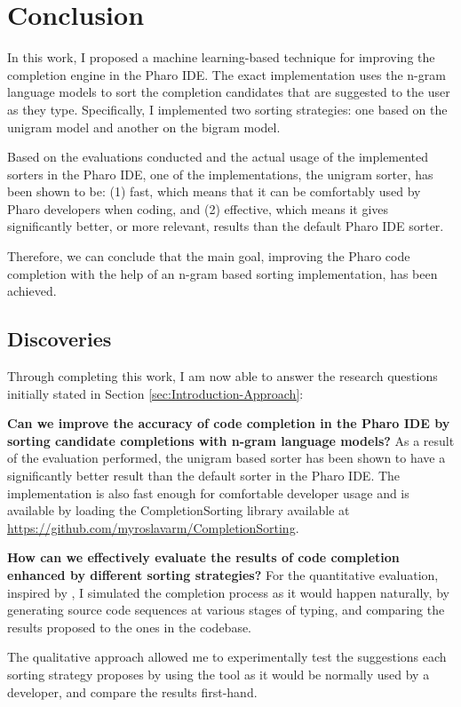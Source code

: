 \documentclass[sigplan,screen]{acmart}
\begin{document}
\section{Conclusion}
In this work, I proposed a machine learning-based technique for improving the completion engine in the Pharo IDE. The exact implementation uses the n-gram language models to sort the completion candidates that are suggested to the user as they type. Specifically, I implemented two sorting strategies: one based on the unigram model and another on the bigram model.

Based on the evaluations conducted and the actual usage of the implemented sorters in the Pharo IDE, one of the implementations, the unigram sorter, has been shown to be: (1) fast, which means that it can be comfortably used by Pharo developers when coding, and (2) effective, which means it gives significantly better, or more relevant, results than the default Pharo IDE sorter.

Therefore, we can conclude that the main goal, improving the Pharo code completion with the help of an n-gram based sorting implementation, has been achieved.

\subsection{Discoveries}
Through completing this work, I am now able to answer the research questions initially stated in Section \ref{sec:Introduction-Approach}:
\begin{RQ}
    \item \textbf{Can we improve the accuracy of code completion in the Pharo IDE by sorting candidate completions with n-gram language models?} As a result of the evaluation performed, the unigram based sorter has been shown to have a significantly better result than the default sorter in the Pharo IDE. The implementation is also fast enough for comfortable developer usage and is available by loading the CompletionSorting library available at \url{https://github.com/myroslavarm/CompletionSorting}.
    \item \textbf{How can we effectively evaluate the results of code completion enhanced by different sorting strategies?} For the quantitative evaluation, inspired by \cite{Robb08a}, I simulated the completion process as it would happen naturally, by generating source code sequences at various stages of typing, and comparing the results proposed to the ones in the codebase.
    
    The qualitative approach allowed me to experimentally test the suggestions each sorting strategy proposes by using the tool as it would be normally used by a developer, and compare the results first-hand.
\end{RQ}
\end{document}
